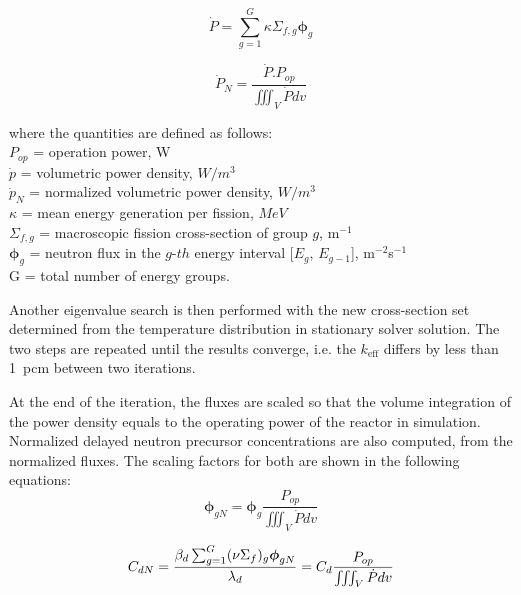 \documentclass{elsarticle}
\newcommand{\keff}{{\ensuremath{k_{\mathrm{eff}}}} }
\newcommand{\flux}{{\ensuremath{\boldsymbol{\phi}}} }
\begin{document}
\begin{equation}
  \dot{P} = \sum_{g=1}^G \kappa \Sigma_{f,g} \flux _g
  \label{eq:powerdensity}
\end{equation}

\begin{equation}
  \dot{P}_N = \frac{\dot{P}.P_{op}}{\iiint_V{\dot{P}dv}}
  \label{eq:scale}
\end{equation}

where the quantities are defined as follows:\\
$P_{op}$ = operation power, W\\
$\dot{p}$ = volumetric power density, $W/m^3$\\
$\dot{p}_N$ = normalized volumetric power density, $W/m^3$\\
$\kappa$ = mean energy generation per fission, $MeV$\\
$\Sigma_{f,g}$ = macroscopic fission cross-section of group $g$, m$^{-1}$\\
$\flux_{g}$ = neutron flux in the $g$-$th$ energy interval [$E_g$, $E_{g-1}$], m$^{-2}$s$^{-1}$\\
G = total number of energy groups.
 
Another eigenvalue search is then performed with the new cross-section set determined from the temperature distribution in stationary solver solution. 
The two steps are repeated until the results converge, i.e. the \keff differs by less than 1~pcm between two iterations.

At the end of the iteration, the fluxes are scaled so that the volume integration of the power density equals to the operating power of the reactor in simulation. Normalized delayed neutron precursor concentrations are also computed, from the normalized fluxes. The scaling factors for both are shown in the following equations:
\begin{equation}
    \flux_{gN} = \flux_g \frac{P_{op}}{\iiint_V{\dot{P}dv}}
\end{equation}

\begin{equation}
      C_{dN} = \frac{\beta_d \sum_{g=1}^G (\nu\Sigma_f)_g \flux_{gN}}{\lambda_d}\\
      = C_d\frac{P_{op}}{\iiint_V{\dot{P}dv}}
\end{equation}
\end{document}

